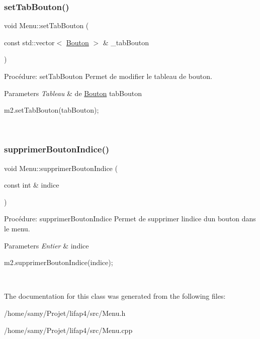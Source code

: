\subsubsection{\texorpdfstring{set\+Tab\+Bouton()}{setTabBouton()}}
{\footnotesize\ttfamily void Menu\+::set\+Tab\+Bouton (\begin{DoxyParamCaption}\item[{const std\+::vector$<$ \hyperlink{classBouton}{Bouton} $>$ \&}]{\+\_\+tab\+Bouton }\end{DoxyParamCaption})}



Procédure\+: set\+Tab\+Bouton Permet de modifier le tableau de bouton. 


\begin{DoxyParams}{Parameters}
{\em Tableau} & de \hyperlink{classBouton}{Bouton} tab\+Bouton 
\begin{DoxyCode}
m2.setTabBouton(tabBouton);
\end{DoxyCode}
 \\
\hline
\end{DoxyParams}
\mbox{\label{classMenu_a1ed5172963be698f6fbabcf5a87ff664}} 
\subsubsection{\texorpdfstring{supprimer\+Bouton\+Indice()}{supprimerBoutonIndice()}}
{\footnotesize\ttfamily void Menu\+::supprimer\+Bouton\+Indice (\begin{DoxyParamCaption}\item[{const int \&}]{indice }\end{DoxyParamCaption})}



Procédure\+: supprimer\+Bouton\+Indice Permet de supprimer l\textquotesingle{}indice d\textquotesingle{}un bouton dans le menu. 


\begin{DoxyParams}{Parameters}
{\em Entier} & indice 
\begin{DoxyCode}
m2.supprimerBoutonIndice(indice);
\end{DoxyCode}
 \\
\hline
\end{DoxyParams}


The documentation for this class was generated from the following files\+:\begin{DoxyCompactItemize}
\item 
/home/samy/\+Projet/lifap4/src/Menu.\+h\item 
/home/samy/\+Projet/lifap4/src/Menu.\+cpp\end{DoxyCompactItemize}
